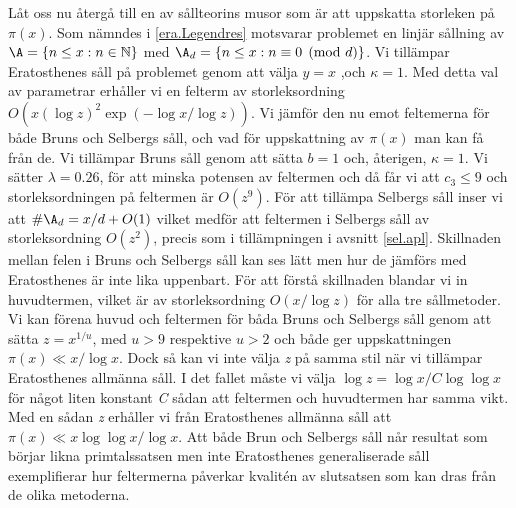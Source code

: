 Låt oss nu återgå till en av sållteorins musor som är att uppskatta storleken på \(\pi(x)\).
Som nämndes i \ref{era.Legendres} motsvarar problemet en linjär sållning av \(\A = \{n\leq x: n\in\mathbb{N}\}\) med \(\A_d = \{n\leq x: n \equiv 0 \pmod{d}\}\). Vi tillämpar Eratosthenes såll på problemet genom att  välja \(y = x\) ,och \(\kappa = 1\).
Med detta val av parametrar erhåller vi en felterm av storleksordning \(O(x(\log z)^2\exp({-\log x/\log z}))\).
Vi jämför den nu emot feltemerna för både Bruns och Selbergs såll, och vad för uppskattning av \(\pi(x)\) man kan få  från de.
Vi tillämpar Bruns såll genom att sätta \(b = 1\) och, återigen, \(\kappa = 1\). 
Vi sätter \(\lambda = 0.26\), för att minska potensen av feltermen och då får vi att \(c_3 \leq 9\) och storleksordningen på feltermen är \(O(z^9)\).
För att tillämpa Selbergs såll inser vi att \(\#\A_d = x/d + O(1)\) vilket medför att feltermen i Selbergs såll av storleksordning \(O(z^2)\), precis som i tillämpningen i avsnitt \ref{sel.apl}.
Skillnaden mellan felen i Bruns och Selbergs såll kan ses lätt men hur de jämförs med Eratosthenes är inte lika uppenbart.
För att förstå skillnaden blandar vi in huvudtermen, vilket är av storleksordning \(O(x/\log z)\) för alla tre sållmetoder.
Vi kan förena huvud och feltermen för båda Bruns och Selbergs såll genom att sätta \(z = x^{1/u}\), med \(u > 9\) respektive \(u > 2\) och både ger uppskattningen \(\pi(x) \ll x/\log x\). 
Dock så kan vi inte välja \textit{z} på samma stil när vi tillämpar Eratosthenes allmänna såll.
I det fallet måste vi välja \(\log z = \log x/C\log\log x\) för något liten konstant \textit{C} sådan att feltermen och huvudtermen har samma vikt.
Med en sådan \textit{z} erhåller vi från Eratosthenes allmänna såll att \(\pi(x) \ll x\log\log x/\log x\).
Att både Brun och Selbergs såll når resultat som börjar likna primtalssatsen men inte Eratosthenes generaliserade såll exemplifierar hur feltermerna påverkar kvalitén av slutsatsen som kan dras från de olika metoderna.

